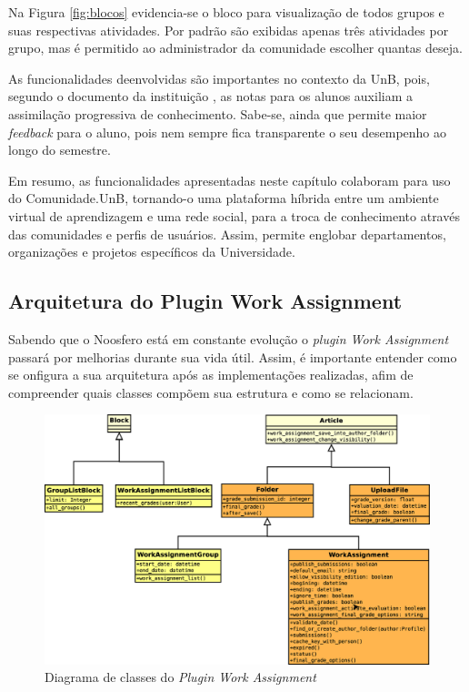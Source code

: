 Na Figura \ref{fig:blocos} evidencia-se o bloco para visualização de todos grupos e suas respectivas atividades. Por padrão são exibidas apenas três atividades por grupo, mas é permitido ao administrador da comunidade escolher quantas deseja.

As funcionalidades deenvolvidas são importantes no contexto da UnB, pois, segundo o documento da instituição , as notas para os alunos auxiliam a assimilação progressiva de conhecimento. Sabe-se, ainda que permite maior \textit{feedback} para o aluno, pois nem sempre fica transparente o seu desempenho ao longo do semestre.

Em resumo, as funcionalidades apresentadas neste capítulo colaboram para uso do Comunidade.UnB, tornando-o uma plataforma híbrida entre um ambiente virtual de aprendizagem e uma rede social, para a troca de conhecimento através das comunidades e perfis de usuários. Assim, permite englobar departamentos, organizações e projetos específicos da Universidade.

\subsection{Arquitetura do Plugin Work Assignment}

Sabendo que o Noosfero está em constante evolução o \textit{plugin Work Assignment} passará por melhorias durante sua vida útil. Assim, é importante entender como se onfigura a sua arquitetura após as implementações realizadas, afim de compreender quais classes compõem sua estrutura e como se relacionam.

\begin{figure}[h]
    \centering
    \includegraphics[keepaspectratio=true,scale=0.3]
      {figuras/diagramaUMLCompletoColor.eps}
    \caption{Diagrama de classes do \textit{Plugin Work Assignment}}
    \label{fig:arquitetura-work}
\end{figure}

